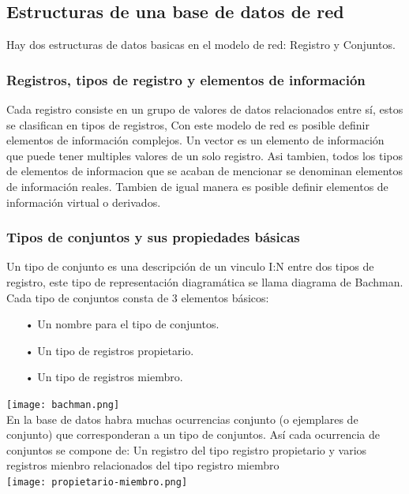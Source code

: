 \documentclass[12pts, A3 ,twosides]{article}
\begin{document}
\subsection{Estructuras de una base de datos de red}
Hay dos estructuras de datos basicas en el modelo de red: Registro y Conjuntos.
\subsubsection{Registros, tipos de registro y elementos de información}
Cada registro consiste en un grupo de valores de datos relacionados entre sí, estos se clasifican en tipos de registros, Con este modelo de red es posible definir elementos de información complejos. Un vector es un elemento de información que puede tener multiples valores de un solo registro. Asi tambien, todos los tipos de elementos de informacion que se acaban de mencionar se denominan elementos de información reales. Tambien de igual manera es posible definir elementos de información virtual o derivados.

\subsubsection{Tipos de conjuntos y sus propiedades básicas}
Un tipo de conjunto es una descripción de un vinculo I:N entre dos tipos de registro, este tipo de representación diagramática se llama diagrama de Bachman. Cada tipo de conjuntos consta de 3 elementos básicos:
\begin{itemize}
\item[•] Un nombre para el tipo de conjuntos.
\item[•] Un tipo de registros propietario.
\item[•] Un tipo de registros miembro.
\end{itemize}
\texttt{[image: bachman.png]}\\
En la base de datos habra muchas ocurrencias conjunto (o ejemplares de conjunto) que corresponderan a un tipo de conjuntos. Así cada ocurrencia de conjuntos se compone de: Un registro del tipo registro propietario y varios registros mienbro relacionados del tipo registro miembro\\
\texttt{[image: propietario-miembro.png]}\\
\end{document}
